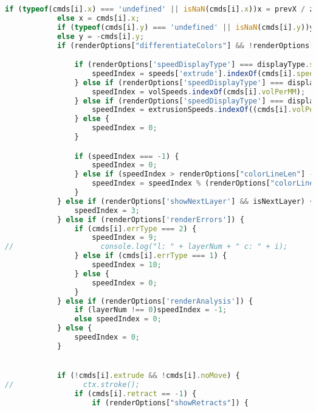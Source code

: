 \begin{lstlisting}[language=JavaScript, label={lst:renderFactory}, caption=When render frames are requested this file compiles the lines of gcode from the worker and sets up the rest of the canvas frames.]
            if (typeof(cmds[i].x) === 'undefined' || isNaN(cmds[i].x))x = prevX / zoomFactor;
            else x = cmds[i].x;
            if (typeof(cmds[i].y) === 'undefined' || isNaN(cmds[i].y))y = prevY / zoomFactor;
            else y = -cmds[i].y;
            if (renderOptions["differentiateColors"] && !renderOptions['showNextLayer'] && !renderOptions['renderAnalysis']) {

                if (renderOptions['speedDisplayType'] === displayType.speed) {
                    speedIndex = speeds['extrude'].indexOf(cmds[i].speed);
                } else if (renderOptions['speedDisplayType'] === displayType.expermm) {
                    speedIndex = volSpeeds.indexOf(cmds[i].volPerMM);
                } else if (renderOptions['speedDisplayType'] === displayType.volpersec) {
                    speedIndex = extrusionSpeeds.indexOf((cmds[i].volPerMM * cmds[i].speed / 60).toFixed(3));
                } else {
                    speedIndex = 0;
                }

                if (speedIndex === -1) {
                    speedIndex = 0;
                } else if (speedIndex > renderOptions["colorLineLen"] - 1) {
                    speedIndex = speedIndex % (renderOptions["colorLineLen"] - 1);
                }
            } else if (renderOptions['showNextLayer'] && isNextLayer) {
                speedIndex = 3;
            } else if (renderOptions['renderErrors']) {
                if (cmds[i].errType === 2) {
                    speedIndex = 9;
//                    console.log("l: " + layerNum + " c: " + i);
                } else if (cmds[i].errType === 1) {
                    speedIndex = 10;
                } else {
                    speedIndex = 0;
                }
            } else if (renderOptions['renderAnalysis']) {
                if (layerNum !== 0)speedIndex = -1;
                else speedIndex = 0;
            } else {
                speedIndex = 0;
            }


            if (!cmds[i].extrude && !cmds[i].noMove) {
//                ctx.stroke();
                if (cmds[i].retract == -1) {
                    if (renderOptions["showRetracts"]) {


\end{lstlisting}
